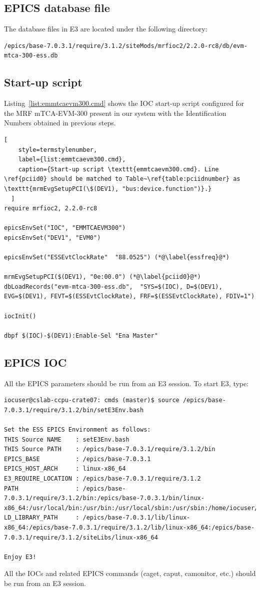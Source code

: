 \documentclass[11pt
  , a4paper
  , article
  , oneside
  , showtrims
]{memoir}
\begin{document}
\subsection{EPICS database file}
The database files in E3 are located under the following directory:
\begin{lstlisting}[style=termstyle]
/epics/base-7.0.3.1/require/3.1.2/siteMods/mrfioc2/2.2.0-rc8/db/evm-mtca-300-ess.db
\end{lstlisting}


\subsection{Start-up script}
Listing~\ref{list:emmtcaevm300.cmd} shows the IOC start-up script configured for the MRF mTCA-EVM-300 present in our system with the Identification Numbers obtained in previous steps.
\begin{lstlisting}[
    style=termstylenumber,
    label={list:emmtcaevm300.cmd},
    caption={Start-up script \texttt{emmtcaevm300.cmd}. Line \ref{pciid0} should be matched to Table~\ref{table:pciidnumber} as \texttt{mrmEvgSetupPCI(\$(DEV1), "bus:device.function")}.}
  ]
require mrfioc2, 2.2.0-rc8

epicsEnvSet("IOC", "EMMTCAEVM300")
epicsEnvSet("DEV1", "EVM0")

epicsEnvSet("ESSEvtClockRate"  "88.0525") (*@\label{essfreq}@*)

mrmEvgSetupPCI($(DEV1), "0e:00.0") (*@\label{pciid0}@*)
dbLoadRecords("evm-mtca-300-ess.db",  "SYS=$(IOC), D=$(DEV1), EVG=$(DEV1), FEVT=$(ESSEvtClockRate), FRF=$(ESSEvtClockRate), FDIV=1")

iocInit()

dbpf $(IOC)-$(DEV1):Enable-Sel "Ena Master"
\end{lstlisting}

\subsection{EPICS IOC}
All the EPICS parameters should be run from an E3 session. To start E3, type:
\begin{lstlisting}[style=termstyle]
iocuser@cslab-ccpu-crate07: cmds (master)$ source /epics/base-7.0.3.1/require/3.1.2/bin/setE3Env.bash

Set the ESS EPICS Environment as follows:
THIS Source NAME    : setE3Env.bash
THIS Source PATH    : /epics/base-7.0.3.1/require/3.1.2/bin
EPICS_BASE          : /epics/base-7.0.3.1
EPICS_HOST_ARCH     : linux-x86_64
E3_REQUIRE_LOCATION : /epics/base-7.0.3.1/require/3.1.2
PATH                : /epics/base-7.0.3.1/require/3.1.2/bin:/epics/base-7.0.3.1/bin/linux-x86_64:/usr/local/bin:/usr/bin:/usr/local/sbin:/usr/sbin:/home/iocuser/.local/bin:/home/iocuser/bin
LD_LIBRARY_PATH     : /epics/base-7.0.3.1/lib/linux-x86_64:/epics/base-7.0.3.1/require/3.1.2/lib/linux-x86_64:/epics/base-7.0.3.1/require/3.1.2/siteLibs/linux-x86_64

Enjoy E3!
\end{lstlisting}
All the IOCs and related EPICS commands (caget, caput, camonitor, etc.) should be run from an E3 session.\\
\end{document}
